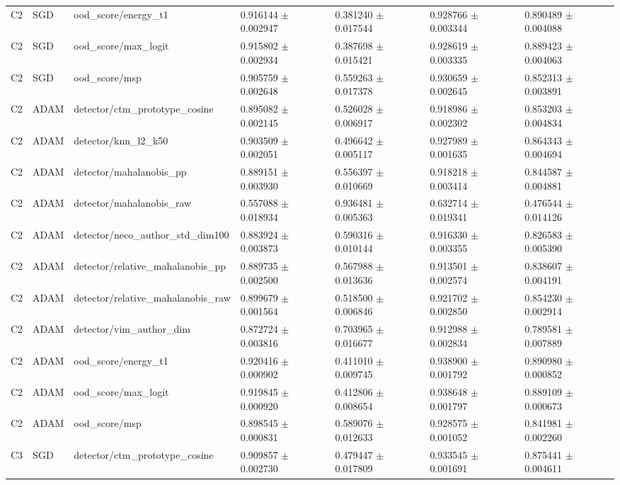\begin{longtable}{lllllll}
C2 & SGD & ood\_score/energy\_t1 & 0.916144 $\pm$ 0.002947 & 0.381240 $\pm$ 0.017544 & 0.928766 $\pm$ 0.003344 & 0.890489 $\pm$ 0.004088 \\
C2 & SGD & ood\_score/max\_logit & 0.915802 $\pm$ 0.002934 & 0.387698 $\pm$ 0.015421 & 0.928619 $\pm$ 0.003335 & 0.889423 $\pm$ 0.004063 \\
C2 & SGD & ood\_score/msp & 0.905759 $\pm$ 0.002648 & 0.559263 $\pm$ 0.017378 & 0.930659 $\pm$ 0.002645 & 0.852313 $\pm$ 0.003891 \\
C2 & ADAM & detector/ctm\_prototype\_cosine & 0.895082 $\pm$ 0.002145 & 0.526028 $\pm$ 0.006917 & 0.918986 $\pm$ 0.002302 & 0.853203 $\pm$ 0.004834 \\
C2 & ADAM & detector/knn\_l2\_k50 & 0.903509 $\pm$ 0.002051 & 0.496642 $\pm$ 0.005117 & 0.927989 $\pm$ 0.001635 & 0.864343 $\pm$ 0.004694 \\
C2 & ADAM & detector/mahalanobis\_pp & 0.889151 $\pm$ 0.003930 & 0.556397 $\pm$ 0.010669 & 0.918218 $\pm$ 0.003414 & 0.844587 $\pm$ 0.004881 \\
C2 & ADAM & detector/mahalanobis\_raw & 0.557088 $\pm$ 0.018934 & 0.936481 $\pm$ 0.005363 & 0.632714 $\pm$ 0.019341 & 0.476544 $\pm$ 0.014126 \\
C2 & ADAM & detector/neco\_author\_std\_dim100 & 0.883924 $\pm$ 0.003873 & 0.590316 $\pm$ 0.010144 & 0.916330 $\pm$ 0.003355 & 0.826583 $\pm$ 0.005390 \\
C2 & ADAM & detector/relative\_mahalanobis\_pp & 0.889735 $\pm$ 0.002500 & 0.567988 $\pm$ 0.013636 & 0.913501 $\pm$ 0.002574 & 0.838607 $\pm$ 0.004191 \\
C2 & ADAM & detector/relative\_mahalanobis\_raw & 0.899679 $\pm$ 0.001564 & 0.518500 $\pm$ 0.006846 & 0.921702 $\pm$ 0.002850 & 0.854230 $\pm$ 0.002914 \\
C2 & ADAM & detector/vim\_author\_dim & 0.872724 $\pm$ 0.003816 & 0.703965 $\pm$ 0.016677 & 0.912988 $\pm$ 0.002834 & 0.789581 $\pm$ 0.007889 \\
C2 & ADAM & ood\_score/energy\_t1 & 0.920416 $\pm$ 0.000902 & 0.411010 $\pm$ 0.009745 & 0.938900 $\pm$ 0.001792 & 0.890980 $\pm$ 0.000852 \\
C2 & ADAM & ood\_score/max\_logit & 0.919845 $\pm$ 0.000920 & 0.412806 $\pm$ 0.008654 & 0.938648 $\pm$ 0.001797 & 0.889109 $\pm$ 0.000673 \\
C2 & ADAM & ood\_score/msp & 0.898545 $\pm$ 0.000831 & 0.589076 $\pm$ 0.012633 & 0.928575 $\pm$ 0.001052 & 0.841981 $\pm$ 0.002260 \\
C3 & SGD & detector/ctm\_prototype\_cosine & 0.909857 $\pm$ 0.002730 & 0.479447 $\pm$ 0.017809 & 0.933545 $\pm$ 0.001691 & 0.875441 $\pm$ 0.004611 \\

\end{longtable}
